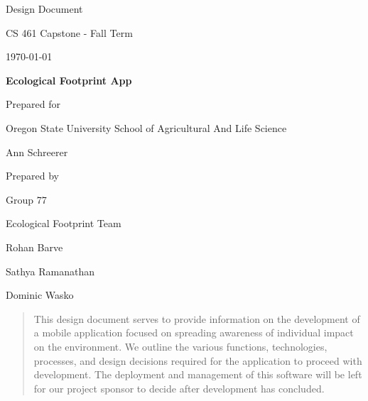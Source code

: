 \documentclass[onecolumn, draftclsnofoot,10pt, compsoc, tikz]{IEEEtran}
\def \CapstoneTeamName{		Ecological Footprint Team}
\def \CapstoneTeamNumber{		77}
\def \GroupMemberOne{			Rohan Barve}
\def \GroupMemberTwo{			Sathya Ramanathan}
\def \GroupMemberThree{			Dominic Wasko}
\def \CapstoneProjectName{		Ecological Footprint App}
\def \CapstoneSponsorCompany{	Oregon State University School of Agricultural And Life Science}
\def \CapstoneSponsorPerson{		Ann Schreerer}
\def \DocType{Design Document}
\newcommand{\NameSigPair}[1]{\par
\makebox[2.75in][r]{#1} \hfil 	\makebox[3.25in]{\makebox[2.25in]{\hrulefill} \hfill		\makebox[.75in]{\hrulefill}}
\par\vspace{-12pt} \textit{\tiny\noindent
\makebox[2.75in]{} \hfil		\makebox[3.25in]{\makebox[2.25in][r]{Signature} \hfill	\makebox[.75in][r]{Date}}}}
\renewcommand{\NameSigPair}[1]{#1}
\begin{document}
\begin{titlepage}
    \begin{singlespace}
        \hfill 
        \par\vspace{.2in}
        \centering
        \scshape{
	 \huge \DocType \par
            \huge CS 461 Capstone - Fall Term \par
            {\large\today}\par
            \vspace{.5in}
            \textbf{\Huge\CapstoneProjectName}\par
            \vfill
            {\large Prepared for}\par
            \Huge \CapstoneSponsorCompany\par
            \vspace{5pt}
            {\Large\NameSigPair{\CapstoneSponsorPerson}\par}
            {\large Prepared by }\par
            Group\CapstoneTeamNumber\par
            \CapstoneTeamName\par 
            \vspace{5pt}
            {\Large
                \NameSigPair{\GroupMemberOne}\par
                \NameSigPair{\GroupMemberTwo}\par
                \NameSigPair{\GroupMemberThree}\par
            }
            \vspace{20pt}
        }
        
        \begin{abstract}
        This design document serves to provide information on the development of a mobile application focused on spreading awareness of individual impact on the environment. We outline the various functions, technologies, processes, and design decisions required for the application to proceed with development. The deployment and management of this software will be left for our project sponsor to decide after development has concluded. 
        	
        \end{abstract}  
        
        
    \end{singlespace}
\end{titlepage}
\newpage
{}
\tableofcontents
\listoffigures
\listoftables
\clearpage
\end{document}
